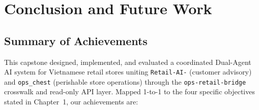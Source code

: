 \chapter{Conclusion and Future Work}

\section{Summary of Achievements}

This capstone designed, implemented, and evaluated a coordinated Dual-Agent AI system for Vietnamese retail stores uniting \texttt{Retail-AI-} (customer advisory) and \texttt{ops\_chest} (perishable store operations) through the \texttt{ops-retail-bridge} crosswalk and read-only API layer. Mapped 1-to-1 to the four specific objectives stated in Chapter~1, our achievements are:


